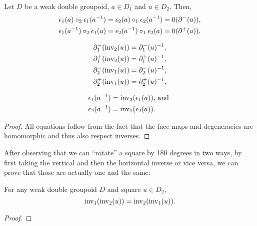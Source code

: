\begin{lemma} \label{thm:dbl-gpd-inv} %
Let $D$ be a weak double groupoid, $a \in D_1$ and $u \in D_2$. Then,
\begin{equation} \label{eq:inv-coherence1}
\begin{aligned}
\epsilon_1(a) \circ_2 \epsilon_1(a^{-1})
	&= \epsilon_2(a) \circ_1 \epsilon_2(a^{-1})
	= 0(\partial^-(a)) \text{,} \\
\epsilon_1(a^{-1}) \circ_2 \epsilon_1(a)
	&= \epsilon_2(a^{-1}) \circ_1 \epsilon_2(a)
	= 0(\partial^+(a)) \text{,}
\end{aligned}
\end{equation}

\begin{equation} \label{eq:inv-coherence2}
\begin{aligned}
\partial^-_1(\operatorname{inv_2}(u)) &= \partial^-_1(u)^{-1} \text{,} \\
\partial^+_1(\operatorname{inv_2}(u)) &= \partial^+_1(u)^{-1} \text{,} \\
\partial^-_2(\operatorname{inv_1}(u)) &= \partial^-_2(u)^{-1} \text{,} \\
\partial^+_2(\operatorname{inv_1}(u)) &= \partial^+_2(u)^{-1} \text{,}
\end{aligned}
\end{equation}

\begin{equation} \label{eq:inv-coherence3}
\begin{aligned}
\epsilon_1(a^{-1}) &= \operatorname{inv_2}(\epsilon_1(a)) \text{, and } \\
\epsilon_2(a^{-1}) &= \operatorname{inv_1}(\epsilon_2(a)) \text{.}
\end{aligned}
\end{equation}
\end{lemma}

\begin{proof}
All equations follow
from the fact that the face maps and degeneracies are homomorphic and thus also respect inverses.
\end{proof}

After observing that we can ``rotate'' a square by 180 degrees in two ways, by first
taking the vertical and then the horizontal inverse or vice versa, we can prove
that those are actually one and the same:

\begin{lemma} \label{thm:rotate-180}
For any weak double groupoid $D$ and square $u \in D_2$,
\begin{equation*}
\operatorname{inv_1}(\operatorname{inv_2}(u)) = \operatorname{inv_2}(\operatorname{inv_1}(u)) \text{.}
\end{equation*}
\end{lemma}

\begin{proof}

\end{proof}







